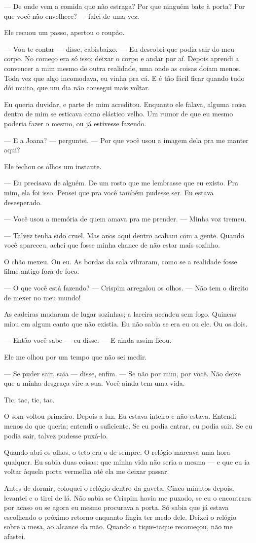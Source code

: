 — De onde vem a comida que não estraga? Por que ninguém bate à porta? Por que você não envelhece? — falei de uma vez.

Ele recuou um passo, apertou o roupão.

— Vou te contar — disse, cabisbaixo. — Eu descobri que podia sair do meu corpo. No começo era só isso: deixar o corpo e andar por aí. Depois aprendi a convencer a mim mesmo de outra realidade, uma onde as coisas doíam menos. Toda vez que algo incomodava, eu vinha pra cá. E é tão fácil ficar quando tudo dói muito, que um dia não consegui mais voltar.

Eu queria duvidar, e parte de mim acreditou. Enquanto ele falava, alguma coisa dentro de mim se esticava como elástico velho. Um rumor de que eu mesmo poderia fazer o mesmo, ou já estivesse fazendo.

— E a Joana? — perguntei. — Por que você usou a imagem dela pra me manter aqui?

Ele fechou os olhos um instante.

— Eu precisava de alguém. De um rosto que me lembrasse que eu existo. Pra mim, ela foi isso. Pensei que pra você também pudesse ser. Eu estava desesperado.

— Você usou a memória de quem amava pra me prender. — Minha voz tremeu.

— Talvez tenha sido cruel. Mas anos aqui dentro acabam com a gente. Quando você apareceu, achei que fosse minha chance de não estar mais sozinho.

O chão mexeu. Ou eu. As bordas da sala vibraram, como se a realidade fosse filme antigo fora de foco.

— O que você está fazendo? — Crispim arregalou os olhos. — Não tem o direito de mexer no meu mundo!

As cadeiras mudaram de lugar sozinhas; a lareira acendeu sem fogo. Quincas miou em algum canto que não existia. Eu não sabia se era eu ou ele. Ou os dois.

— Então você sabe — eu disse. — E ainda assim ficou.

Ele me olhou por um tempo que não sei medir.

— Se puder sair, saia — disse, enfim. — Se não por mim, por você. Não deixe que a minha desgraça vire a sua. Você ainda tem uma vida.

Tic, tac, tic, tac.

O som voltou primeiro. Depois a luz. Eu estava inteiro e não estava. Entendi menos do que queria; entendi o suficiente. Se eu podia entrar, eu podia sair. Se eu podia sair, talvez pudesse puxá-lo.

Quando abri os olhos, o teto era o de sempre. O relógio marcava uma hora qualquer. Eu sabia duas coisas: que minha vida não seria a mesma — e que eu ia voltar àquela porta vermelha até ela me deixar passar.

\medskip

Antes de dormir, coloquei o relógio dentro da gaveta. Cinco minutos depois, levantei e o tirei de lá. Não sabia se Crispim havia me puxado, se eu o encontrara por acaso ou se agora eu mesmo procurava a porta. Só sabia que já estava escolhendo o próximo retorno enquanto fingia ter medo dele. Deixei o relógio sobre a mesa, ao alcance da mão. Quando o tique-taque recomeçou, não me afastei.
